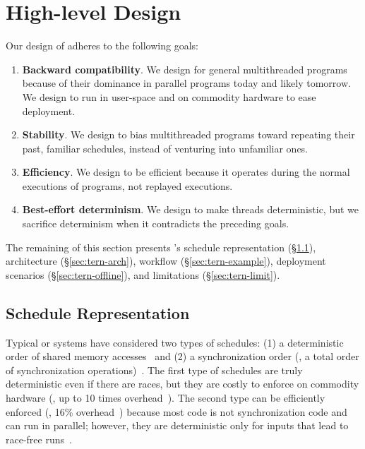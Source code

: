 \section{High-level Design}\label{sec:tern-design}


Our design of \tern adheres to the following goals:

\begin{enumerate}

\item {\bf Backward compatibility}.  We design \tern for general
  multithreaded programs because of their dominance in parallel programs
  today and likely tomorrow.  We design \tern to run in user-space and on
  commodity hardware to ease deployment.

\item {\bf Stability}.  We design \tern to bias multithreaded programs
  toward repeating their past, familiar schedules, instead of venturing
  into unfamiliar ones.

\item {\bf Efficiency}.  We design \tern to be efficient because it
  operates during the normal executions of programs, not replayed
  executions.

\item {\bf Best-effort determinism}.  We design \tern to make threads
  deterministic, but we sacrifice determinism when it contradicts the
  preceding goals.

\end{enumerate}

The remaining of this section presents \tern's schedule
representation (\S\ref{sec:tern-define-schedule}), architecture
(\S\ref{sec:tern-arch}), workflow (\S\ref{sec:tern-example}), deployment
scenarios (\S\ref{sec:tern-offline}), and limitations (\S\ref{sec:tern-limit}).

\subsection{Schedule Representation}
\label{sec:tern-define-schedule}

Typical \smt or \dmt systems have considered two types of schedules: (1) a
deterministic order of shared memory
accesses~\cite{dmp:asplos09,coredet:asplos10} and (2) a synchronization
order (\ie, a total order of synchronization operations)~\cite{kendo:asplos09}. 
The first type of schedules are truly deterministic even if there are races, but
they are costly to enforce on commodity hardware (\eg, up to 10 times
overhead~\cite{coredet:asplos10}).  The second type can be efficiently enforced
(\eg, 16\% overhead~\cite{kendo:asplos09}) because most code is not
synchronization code and can run in parallel; however, they are deterministic
only for inputs that lead to race-free runs~\cite{recplay:tocs,kendo:asplos09}.

